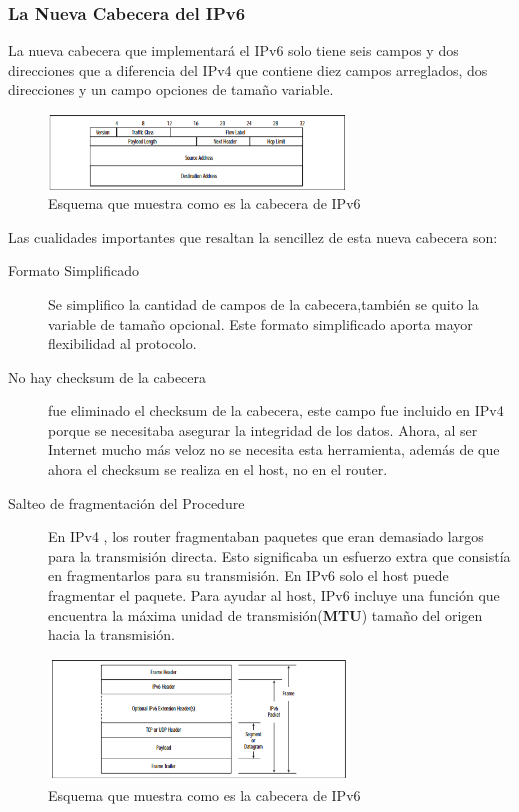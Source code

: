 \documentclass[11pt,a4paper]{article}
\begin{document}
\subsubsection{La Nueva Cabecera del IPv6}
La nueva cabecera que implementará el IPv6 solo tiene seis campos y dos direcciones que a diferencia 
del IPv4 que contiene diez campos arreglados, dos direcciones y un campo opciones de tamaño 
variable.
\begin{figure}[h!]
 \centering
 \includegraphics[width=0.71\textwidth]{ipv6head.png}
 \caption[Valores del campo scope]{Esquema que muestra como es la cabecera de IPv6}
\end{figure} \par
Las cualidades importantes que resaltan la sencillez de esta nueva cabecera son:
\begin{description}
\item[Formato Simplificado] Se simplifico la cantidad de campos de la cabecera,también se quito la 
variable de tamaño opcional. Este formato simplificado aporta mayor flexibilidad al protocolo.
\item[No hay checksum de la cabecera] fue eliminado el checksum de la cabecera, este campo fue 
incluido en IPv4 porque  se necesitaba asegurar la integridad de los datos. Ahora, al ser Internet 
mucho más veloz no se necesita esta herramienta, además de que ahora el checksum se realiza en el 
host, no en el router.
\item[Salteo de fragmentación del Procedure] En IPv4 , los router fragmentaban paquetes que eran 
demasiado largos para la transmisión directa. Esto significaba un esfuerzo extra que consistía en 
fragmentarlos para su transmisión. En IPv6 solo el host puede fragmentar el paquete. Para ayudar al 
host, IPv6 incluye una función que encuentra la máxima unidad de transmisión(\textbf{MTU}) tamaño 
del origen hacia la transmisión.

\end {description}
\begin{figure}[h!]
 \centering
 \includegraphics[width=0.71\textwidth]{header.png}
 \caption[Cabeceras IPv6]{Esquema que muestra como es la cabecera de IPv6}
\end{figure} \par
\end{document}
